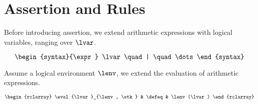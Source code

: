 \section{Assertion and Rules\label{sec:assertion}}

Before introducing assertion, we extend arithmetic expressions with logical variables, ranging over \( \lvar \).

\[
    \begin{syntax}{\expr}
        \lvar \quad | \quad \dots 
    \end{syntax}
\]

Assume a logical environment \( \lenv \), we extend the evaluation of arithmetic expressions.

\[
\begin{rclarray}
    \eval{\lvar}_{\lenv, \stk} & \defeq & \lenv(\lvar)
\end{rclarray}
\]


